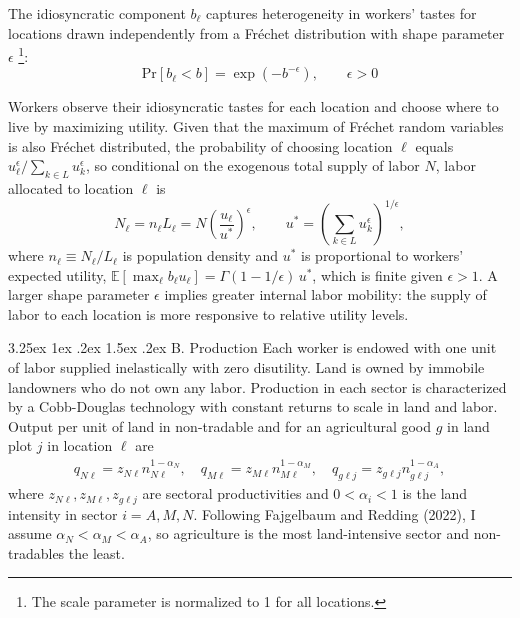 \documentclass[11pt]{article}
\makeatletter
\renewcommand\paragraph{\@startsection{paragraph}{4}{\z@}%
  {3.25ex \@plus 1ex \@minus .2ex}%
  {1.5ex \@plus .2ex}%
  {\normalfont\normalsize\bfseries}}
\makeatother
\begin{document}
The idiosyncratic component $b_\ell$ captures heterogeneity in workers' tastes for locations drawn independently from a Fréchet distribution with shape parameter $\epsilon$ \footnote{The scale parameter is normalized to 1 for all locations.}:
\begin{equation}
    \text{Pr}[b_{\ell}<b] = \exp(-b^{-\epsilon}), \qquad \epsilon>0
\end{equation}

Workers observe their idiosyncratic tastes for each location and choose where to live by maximizing utility. Given that the maximum of Fréchet random variables is also Fréchet distributed, the probability of choosing location $\ell$ equals $u_\ell^\epsilon/\sum_{k \in L} u_k^\epsilon$, so conditional on the exogenous total supply of labor $N$, labor allocated to location $\ell$ is
\begin{equation}
N_\ell = n_\ell L_\ell = N \left(\frac{u_\ell}{u^*}\right)^{\epsilon},
\qquad
u^* = \left( \sum_{k \in L} u_k^\epsilon \right)^{1/\epsilon},
\label{eq:density_supply}
\end{equation}
where $n_\ell \equiv N_\ell/L_\ell$ is population density and $u^*$ is proportional to workers' expected utility, $\mathbb{E}[\max_\ell b_\ell u_\ell]=\Gamma(1-1/\epsilon)\,u^*$, which is finite given $\epsilon>1$. A larger shape parameter $\epsilon$ implies greater internal labor mobility: the supply of labor to each location is more responsive to relative utility levels.

\paragraph{B. Production}
Each worker is endowed with one unit of labor supplied inelastically with zero disutility. Land is owned by immobile landowners who do not own any labor. Production in each sector is characterized by a Cobb-Douglas technology with constant returns to scale in land and labor. Output per unit of land in non-tradable and for an agricultural good $g$ in land plot $j$ in location $\ell$ are
\begin{align}
    q_{N\ell} = z_{N\ell} n_{N\ell}^{1-\alpha_N}, \quad
    q_{M\ell} = z_{M\ell} n_{M\ell}^{1-\alpha_M}, \quad
    q_{g\ell j} = z_{g\ell j} n_{g\ell j}^{1-\alpha_A},
\end{align}
where $z_{N\ell},z_{M\ell}, z_{g\ell j}$ are sectoral productivities and $0<\alpha_i<1$ is the land intensity in sector $i=A, M, N$. Following Fajgelbaum and Redding (2022), I assume $\alpha_N<\alpha_M<\alpha_A$, so agriculture is the most land-intensive sector and non-tradables the least.
\end{document}
